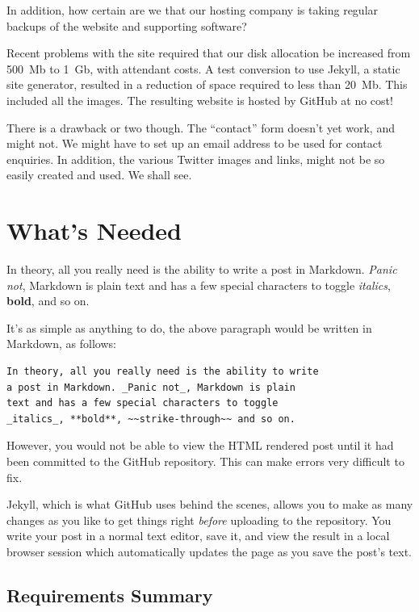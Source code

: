 In addition, how certain are we that our hosting company is taking regular backups of the website and supporting software?

Recent problems with the site required that our disk allocation be increased from 500~Mb to 1~Gb, with attendant costs. A test conversion to use Jekyll, a static site generator, resulted in a reduction of space required to less than 20~Mb. This included all the images. The resulting website is hosted by GitHub at no cost!

There is a drawback or two though. The ``contact'' form doesn't yet work, and might not. We might have to set up an email address to be used for contact enquiries. In addition, the various Twitter images and links, might not be so easily created and used. We shall see.

\section{What's Needed}

In theory, all you really need is the ability to write a post in Markdown. \emph{Panic not}, Markdown is plain text and has a few special characters to toggle \textit{italics}, \textbf{bold},  and so on.

It's as simple as anything to do, the above paragraph would be written in Markdown, as follows:

\begin{lstlisting}[caption={Markdown example paragraph},style={myText}]
In theory, all you really need is the ability to write
a post in Markdown. _Panic not_, Markdown is plain
text and has a few special characters to toggle
_italics_, **bold**, ~~strike-through~~ and so on.
\end{lstlisting}

However, you would not be able to view the HTML rendered post until it had been committed to the GitHub repository. This can make errors very difficult to fix.

Jekyll, which is what GitHub uses behind the scenes, allows you to make as many changes as you like to get things right \emph{before} uploading to the repository. You write your post in a normal text editor, save it, and view the result in a local browser session which automatically updates the page as you save the post's text.

\subsection{Requirements Summary}

